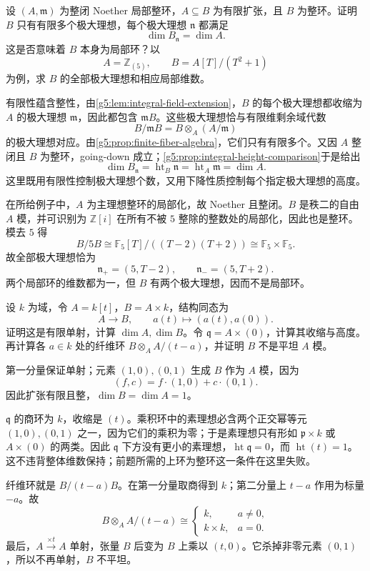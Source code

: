 \begin{exercise}\label{g5:ex:finite-local-base-maximals}
	设 \((A,\mathfrak m)\) 为整闭 Noether 局部整环，\(A\subseteq B\) 为有限扩张，且 \(B\) 为整环。证明 \(B\) 只有有限多个极大理想，每个极大理想 \(\mathfrak n\) 都满足
	\[
		\dim B_{\mathfrak n}=\dim A.
	\]
	这是否意味着 \(B\) 本身为局部环？以
	\[
		A=\mathbb Z_{(5)},\qquad B=A[T]/(T^2+1)
	\]
	为例，求 \(B\) 的全部极大理想和相应局部维数。
\end{exercise}
\begin{solution}
	有限性蕴含整性，由\cref{g5:lem:integral-field-extension}，\(B\) 的每个极大理想都收缩为 \(A\) 的极大理想 \(\mathfrak m\)，因此都包含 \(\mathfrak mB\)。这些极大理想恰与有限维剩余域代数
	\[
		B/\mathfrak mB=B\otimes_A(A/\mathfrak m)
	\]
	的极大理想对应。由\cref{g5:prop:finite-fiber-algebra}，它们只有有限多个。又因 \(A\) 整闭且 \(B\) 为整环，going-down 成立；\cref{g5:prop:integral-height-comparison}于是给出
	\[
		\dim B_{\mathfrak n}
		=\operatorname{ht}_B\mathfrak n
		=\operatorname{ht}_A\mathfrak m
		=\dim A.
	\]
	这里既用有限性控制极大理想个数，又用下降性质控制每个指定极大理想的高度。

	在所给例子中，\(A\) 为主理想整环的局部化，故 Noether 且整闭。\(B\) 是秩二的自由 \(A\) 模，并可识别为 \(\mathbb Z[i]\) 在所有不被 \(5\) 整除的整数处的局部化，因此也是整环。模去 \(5\) 得
	\[
		B/5B\cong\mathbb F_5[T]/((T-2)(T+2))
		\cong\mathbb F_5\times\mathbb F_5.
	\]
	故全部极大理想恰为
	\[
		\mathfrak n_+=(5,T-2),\qquad
		\mathfrak n_-=(5,T+2).
	\]
	两个局部环的维数都为一，但 \(B\) 有两个极大理想，因而不是局部环。
\end{solution}

\begin{exercise}\label{g5:ex:finite-extra-point}
	设 \(k\) 为域，令 \(A=k[t]\)，\(B=A\times k\)，结构同态为
	\[
		A\longrightarrow B,\qquad a(t)\longmapsto(a(t),a(0)).
	\]
	证明这是有限单射，计算 \(\dim A,\dim B\)。令 \(\mathfrak q=A\times(0)\)，计算其收缩与高度。再计算各 \(a\in k\) 处的纤维环 \(B\otimes_A A/(t-a)\)，并证明 \(B\) 不是平坦 \(A\) 模。
\end{exercise}
\begin{solution}
	第一分量保证单射；元素 \((1,0),(0,1)\) 生成 \(B\) 作为 \(A\) 模，因为
	\[
		(f,c)=f\cdot(1,0)+c\cdot(0,1).
	\]
	因此扩张有限且整，\(\dim B=\dim A=1\)。

	\(\mathfrak q\) 的商环为 \(k\)，收缩是 \((t)\)。乘积环中的素理想必含两个正交幂等元 \((1,0),(0,1)\) 之一，因为它们的乘积为零；于是素理想只有形如 \(\mathfrak p\times k\) 或 \(A\times(0)\) 的两类。因此 \(\mathfrak q\) 下方没有更小的素理想，\(\operatorname{ht}\mathfrak q=0\)，而 \(\operatorname{ht}(t)=1\)。这不违背整体维数保持；前题所需的上环为整环这一条件在这里失败。

	纤维环就是 \(B/(t-a)B\)。在第一分量取商得到 \(k\)；第二分量上 \(t-a\) 作用为标量 \(-a\)。故
	\[
		B\otimes_A A/(t-a)\cong
		\begin{cases}
			k,&a\ne0,\\
			k\times k,&a=0.
		\end{cases}
	\]
	最后，\(A\xrightarrow{\times t}A\) 单射，张量 \(B\) 后变为 \(B\) 上乘以 \((t,0)\)。它杀掉非零元素 \((0,1)\)，所以不再单射，\(B\) 不平坦。
\end{solution}


